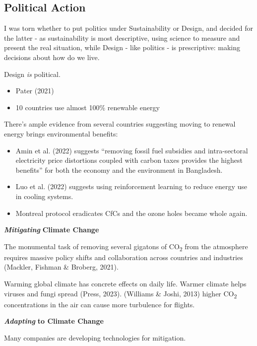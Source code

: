\documentclass[
  letterpaper,
  DIV=11,
  numbers=noendperiod]{scrartcl}
\providecommand{\tightlist}{%
  \setlength{\itemsep}{0pt}\setlength{\parskip}{0pt}}\usepackage{longtable,booktabs,array}
\begin{document}
\subsection{Political Action}\label{political-action}

I was torn whether to put politics under Sustainability or Design, and
decided for the latter - as sustainability is most descriptive, using
science to measure and present the real situation, while Design - like
politics - is prescriptive: making decisions about how do we live.

Design \emph{is} political.

\begin{itemize}
\tightlist
\item
  Pater (2021)
\item
  10 countries use almost 100\% renewable energy
\end{itemize}

There's ample evidence from several countries suggesting moving to
renewal energy brings environmental benefits:

\begin{itemize}
\item
  Amin et al. (2022) suggests ``removing fossil fuel subsidies and
  intra-sectoral electricity price distortions coupled with carbon taxes
  provides the highest benefits'' for both the economy and the
  environment in Bangladesh.
\item
  Luo et al. (2022) suggests using reinforcement learning to reduce
  energy use in cooling systems.
\item
  Montreal protocol eradicates CfCs and the ozone holes became whole
  again.
\end{itemize}

\textbf{\emph{Mitigating}} \textbf{Climate Change}

The monumental task of removing several gigatons of CO\textsubscript{2}
from the atmosphere requires massive policy shifts and collaboration
across countries and industries (Mackler, Fishman \& Broberg, 2021).

Warming global climate has concrete effects on daily life. Warmer
climate helps viruses and fungi spread (Press, 2023). (Williams \&
Joshi, 2013) higher CO\textsubscript{2} concentrations in the air can
cause more turbulence for flights.

\textbf{\emph{Adapting}} \textbf{to Climate Change}

Many companies are developing technologies for mitigation.
\end{document}
